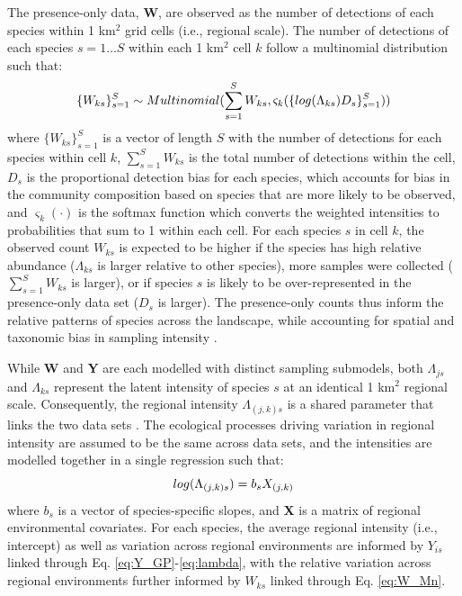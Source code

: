 \documentclass[preprint,review,times,12pt,3p]{elsarticle}
\begin{document}
The presence-only data, \textbf{W}, are observed as the number of detections of each species within 1 km$^2$ grid cells (i.e., regional scale). The number of detections of each species $s=1 \dots S$ within each 1 km$^2$ cell $k$ follow a multinomial distribution such that:
    \begin{equation}
        \{W_{ks}\}_{s=1}^{S} \sim Multinomial(\sum_{s=1}^{S} W_{ks} , \varsigma_k(\{log(\Lambda_{ks})D_s\}_{s=1}^{S})) \\
        \label{eq:W_Mn}
    \end{equation}
where $\{W_{ks}\}_{s=1}^{S}$ is a vector of length $S$ with the number of detections for each species within cell $k$, $\sum_{s=1}^{S} W_{ks}$ is the total number of detections within the cell, $D_s$ is the proportional detection bias for each species, which accounts for bias in the community composition based on species that are more likely to be observed, and $\varsigma_k(\cdot)$ is the softmax function which converts the weighted intensities to probabilities that sum to 1 within each cell. For each species $s$ in cell $k$, the observed count $W_{ks}$ is expected to be higher if the species has high relative abundance ($\Lambda_{ks}$ is larger relative to other species), more samples were collected ($\sum_{s=1}^{S} W_{ks}$ is larger), or if species $s$ is likely to be over-represented in the presence-only data set ($D_s$ is larger). The presence-only counts thus inform the relative patterns of species across the landscape, while accounting for spatial and taxonomic bias in sampling intensity \citep{Isaac2014}.

While \textbf{W} and \textbf{Y} are each modelled with distinct sampling submodels, both $\Lambda_{js}$ and $\Lambda_{ks}$ represent the latent intensity of species $s$ at an identical 1 km$^2$ regional scale. Consequently, the regional intensity $\Lambda_{(j,k)s}$ is a shared parameter that links the two data sets \citep{Hefley2016,Isaac2019,Miller2019}. The ecological processes driving variation in regional intensity are assumed to be the same across data sets, and the intensities are modelled together in a single regression such that:
    \begin{equation}
        log(\Lambda_{(j,k)s}) = b_s X_{(j,k)} \\
        \label{eq:LAMBDA}
    \end{equation}
where $b_s$ is a vector of species-specific slopes, and \textbf{X} is a matrix of regional environmental covariates. For each species, the average regional intensity (i.e., intercept) as well as variation across regional environments are informed by $Y_{is}$ linked through Eq. \ref{eq:Y_GP}-\ref{eq:lambda}, with the relative variation across regional environments further informed by $W_{ks}$ linked through Eq. \ref{eq:W_Mn}.  
\end{document}
